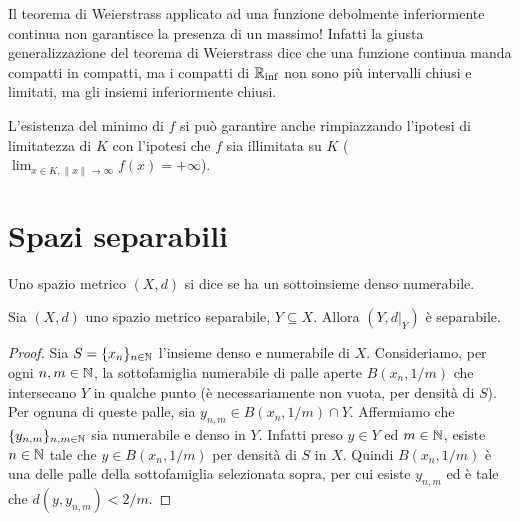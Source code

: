 \begin{remark}
	Il teorema di Weierstrass applicato ad una funzione debolmente inferiormente continua non garantisce la presenza di un massimo! Infatti la giusta generalizzazione del teorema di Weierstrass dice che una funzione continua manda compatti in compatti, ma i compatti di $\mathbb{R}_{\inf}$ non sono più intervalli chiusi e limitati, ma gli insiemi inferiormente chiusi.
\end{remark}

\begin{remark}
	L'esistenza del minimo di $f$ si può garantire anche rimpiazzando l'ipotesi di limitatezza di $K$ con l'ipotesi che $f$ sia illimitata su $K$ ($\lim_{x \in K, \|x\| \to \infty} f(x) = +\infty$).
\end{remark}

\section{Spazi separabili}
\begin{definition}
	Uno spazio metrico $(X, d)$ si dice  se ha un sottoinsieme denso numerabile.
\end{definition}

\begin{lemma}
	Sia $(X,d)$ uno spazio metrico separabile, $Y \subseteq X$.
	Allora $(Y, d\vert_Y)$ è separabile.
\end{lemma}
\begin{proof}
	Sia $S = \{x_n\}_{n \in \mathbb{N}}$ l'insieme denso e numerabile di $X$. Consideriamo, per ogni $n,m \in \mathbb{N}$, la sottofamiglia numerabile di palle aperte $B(x_n, 1/m)$ che intersecano $Y$ in qualche punto (è necessariamente non vuota, per densità di $S$). Per ognuna di queste palle, sia $y_{n,m} \in B(x_n, 1/m) \cap Y$. Affermiamo che $\{y_{n,m}\}_{n,m \in \mathbb{N}}$ sia numerabile e denso in $Y$. Infatti preso $y \in Y$ ed $m \in \mathbb{N}$, esiste $n \in \mathbb{N}$ tale che $y \in B(x_n, 1/m)$ per densità di $S$ in $X$. Quindi $B(x_n, 1/m)$ è una delle palle della sottofamiglia selezionata sopra, per cui esiste $y_{n,m}$ ed è tale che $d(y,y_{n,m}) < 2/m$.
\end{proof}

